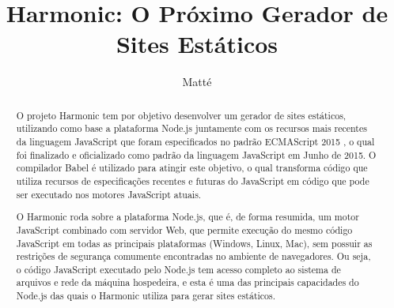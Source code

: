 \documentclass[ppginf, pep]{esinucpel}
\title{Harmonic: O Próximo Gerador de Sites Estáticos}
\author{Matté}{Fabrício da Silva}
\begin{document}

\maketitle
\sloppy


\tableofcontents

\begin{abstract}

O projeto Harmonic tem por objetivo desenvolver um gerador de sites estáticos, utilizando como base a plataforma Node.js juntamente com os recursos mais recentes da linguagem JavaScript que foram especificados no padrão ECMAScript 2015 \cite{es2015}, o qual foi finalizado e oficializado como padrão da linguagem JavaScript em Junho de 2015. O compilador Babel é utilizado para atingir este objetivo, o qual transforma código que utiliza recursos de especificações recentes e futuras do JavaScript em código que pode ser executado nos motores JavaScript atuais.

O Harmonic roda sobre a plataforma Node.js, que é, de forma resumida, um motor JavaScript combinado com servidor Web, que permite execução do mesmo código JavaScript em todas as principais plataformas (Windows, Linux, Mac), sem possuir as restrições de segurança comumente encontradas no ambiente de navegadores. Ou seja, o código JavaScript executado pelo Node.js tem acesso completo ao sistema de arquivos e rede da máquina hospedeira, e esta é uma das principais capacidades do Node.js das quais o Harmonic utiliza para gerar sites estáticos.

\end{abstract}
\end{document}

